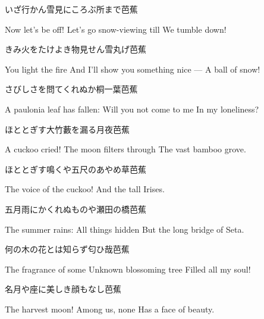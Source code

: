 \begin{haiku}
    {\FH いざ行かん雪見にころぶ所まで}\hfill{\FH 芭蕉}

    \vin{} Now let's be off!
    \vin{} \vin{} Let's go snow-viewing till
    \vin{} \vin{} \vin{} We tumble down!
\end{haiku}

\begin{haiku}
    {\FH きみ火をたけよき物見せん雪丸げ}\hfill{\FH 芭蕉}

    \vin{} You light the fire
    \vin{} \vin{} And I'll show you something nice ---
    \vin{} \vin{} \vin{} A ball of snow!
\end{haiku}

\begin{haiku}
    {\FH さびしさを問てくれぬか桐一葉}\hfill{\FH 芭蕉}

    \vin{} A paulonia leaf has fallen:
    \vin{} \vin{} Will you not come to me
    \vin{} \vin{} \vin{} In my loneliness?
\end{haiku}

\begin{haiku}
    {\FH ほととぎす大竹藪を漏る月夜}\hfill{\FH 芭蕉}

    \vin{} A cuckoo cried!
    \vin{} \vin{} The moon filters through
    \vin{} \vin{} \vin{} The vast bamboo grove.
\end{haiku}

\begin{haiku}
    {\FH ほととぎす鳴くや五尺のあやめ草}\hfill{\FH 芭蕉}

    \vin{} The voice of the cuckoo!
    \vin{} \vin{} And the tall
    \vin{} \vin{} \vin{} Irises.
\end{haiku}

\begin{haiku}
    {\FH 五月雨にかくれぬものや瀬田の橋}\hfill{\FH 芭蕉}

    \vin{} The summer rains:
    \vin{} \vin{} All things hidden
    \vin{} \vin{} \vin{} But the long bridge of Seta.
\end{haiku}

\begin{haiku}
    {\FH 何の木の花とは知らず匂ひ哉}\hfill{\FH 芭蕉}

    \vin{} The fragrance of some
    \vin{} \vin{} Unknown blossoming tree
    \vin{} \vin{} \vin{} Filled all my soul!
\end{haiku}

\begin{haiku}
    {\FH 名月や座に美しき顔もなし}\hfill{\FH 芭蕉}

    \vin{} The harvest moon!
    \vin{} \vin{} Among us, none
    \vin{} \vin{} \vin{} Has a face of beauty.
\end{haiku}

